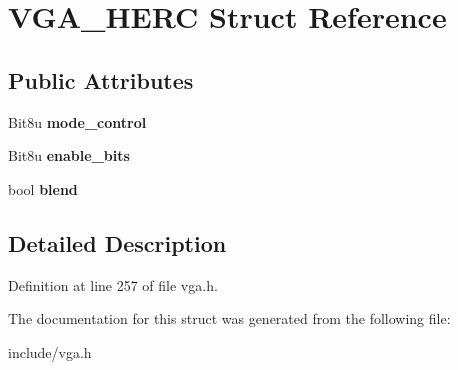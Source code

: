 \hypertarget{structVGA__HERC}{\section{V\-G\-A\-\_\-\-H\-E\-R\-C Struct Reference}
\label{structVGA__HERC}
}
\subsection*{Public Attributes}
\begin{DoxyCompactItemize}
\item 
\hypertarget{structVGA__HERC_ab6ac3f557c940847cfadec99c7f71c74}{Bit8u {\bfseries mode\-\_\-control}}\label{structVGA__HERC_ab6ac3f557c940847cfadec99c7f71c74}

\item 
\hypertarget{structVGA__HERC_a3583e1934895677bfdf4cd907b81c479}{Bit8u {\bfseries enable\-\_\-bits}}\label{structVGA__HERC_a3583e1934895677bfdf4cd907b81c479}

\item 
\hypertarget{structVGA__HERC_af5435dbc6b4458a9565c18d05741f979}{bool {\bfseries blend}}\label{structVGA__HERC_af5435dbc6b4458a9565c18d05741f979}

\end{DoxyCompactItemize}


\subsection{Detailed Description}


Definition at line 257 of file vga.\-h.



The documentation for this struct was generated from the following file\-:\begin{DoxyCompactItemize}
\item 
include/vga.\-h\end{DoxyCompactItemize}
